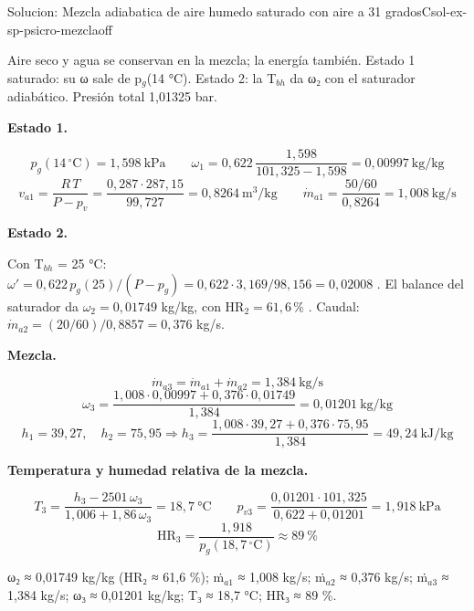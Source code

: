 \documentclass[11pt,a4paper]{article}
\begin{document}
\begin{ocg}{Solucion: Mezcla adiabatica de aire humedo saturado con aire a 31  gradosC}{sol-ex-sp-psicro-mezcla}{off}
\begin{antesbox}
Aire seco y agua se conservan en la mezcla; la energía también. Estado 1 saturado: su ω sale de p$_{g}$(14 °C). Estado 2: la T$_{bh}$ da ω₂ con el saturador adiabático. Presión total 1,01325 bar.
\end{antesbox}

\par\medskip\noindent\textbf{Estado 1.}\par
\[p_{g}(14\,^{\circ}\text{C}) = 1{,}598\ \text{kPa} \qquad \omega_1 = 0{,}622\,\frac{1{,}598}{101{,}325 - 1{,}598} = 0{,}00997\ \text{kg/kg}\]   \[v_{a1} = \frac{R\,T}{P - p_v} = \frac{0{,}287\cdot 287{,}15}{99{,}727} = 0{,}8264\ \text{m}^3/\text{kg} \qquad \dot m_{a1} = \frac{50/60}{0{,}8264} = 1{,}008\ \text{kg/s}\]

\par\medskip\noindent\textbf{Estado 2.}\par
Con T$_{bh}$ = 25 °C:  $\omega' = 0{,}622\,p_g(25)/(P - p_g) = 0{,}622\cdot 3{,}169/98{,}156 = 0{,}02008$ . El balance del saturador da  $\omega_2 = 0{,}01749$  kg/kg, con  $\mathrm{HR}_2 = 61{,}6\,\%$ . Caudal:  $\dot m_{a2} = (20/60)/0{,}8857 = 0{,}376$  kg/s.

\par\medskip\noindent\textbf{Mezcla.}\par
\[\dot m_{a3} = \dot m_{a1} + \dot m_{a2} = 1{,}384\ \text{kg/s}\]   \[\omega_3 = \frac{1{,}008\cdot 0{,}00997 + 0{,}376\cdot 0{,}01749}{1{,}384} = 0{,}01201\ \text{kg/kg}\]   \[h_1 = 39{,}27,\quad h_2 = 75{,}95 \Rightarrow h_3 = \frac{1{,}008\cdot 39{,}27 + 0{,}376\cdot 75{,}95}{1{,}384} = 49{,}24\ \text{kJ/kg}\]

\par\medskip\noindent\textbf{Temperatura y humedad relativa de la mezcla.}\par
\[T_3 = \frac{h_3 - 2501\,\omega_3}{1{,}006 + 1{,}86\,\omega_3} = 18{,}7\ \text{°C} \qquad p_{v3} = \frac{0{,}01201\cdot 101{,}325}{0{,}622 + 0{,}01201} = 1{,}918\ \text{kPa}\]   \[\mathrm{HR}_3 = \frac{1{,}918}{p_g(18{,}7\,^{\circ}\text{C})} \approx 89\ \%\]

\begin{resbox}
ω₂ ≈ 0,01749 kg/kg (HR₂ ≈ 61,6 \%); ṁ$_{a1}$ ≈ 1,008 kg/s; ṁ$_{a2}$ ≈ 0,376 kg/s; ṁ$_{a3}$ ≈ 1,384 kg/s; ω₃ ≈ 0,01201 kg/kg; T₃ ≈ 18,7 °C; HR₃ ≈ 89 \%.
\end{resbox}


\end{ocg}
\end{document}
